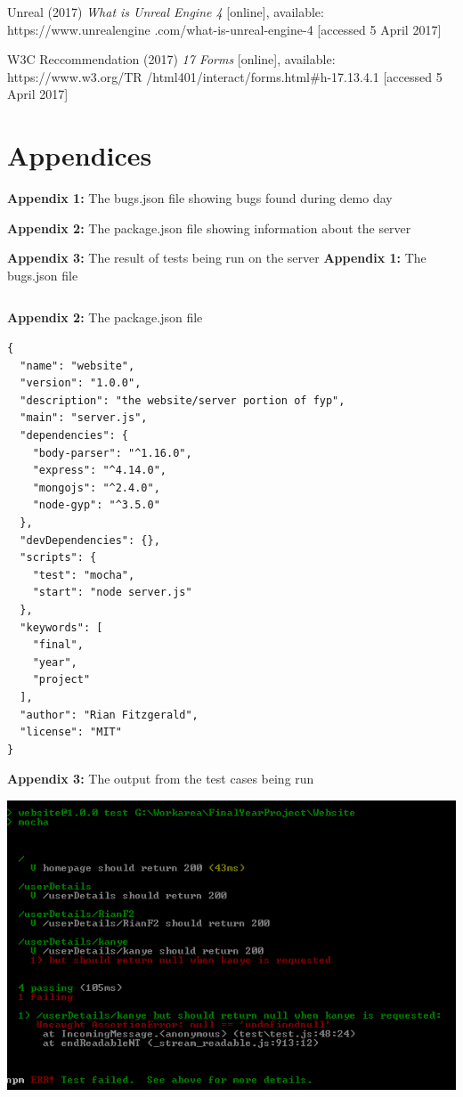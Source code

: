 \documentclass[12pt]{article}
\begin{document}
Unreal (2017) \textit{What is Unreal Engine 4} [online], available: https://www.unrealengine
\hangindent=0.5in .com/what-is-unreal-engine-4 [accessed 5 April 2017]

W3C Reccommendation (2017) \textit{17 Forms} [online], available: https://www.w3.org/TR
\hangindent=0.5in/html401/interact/forms.html{\#}h-17.13.4.1 [accessed 5 April 2017]

\newpage
\section*{Appendices}
\textbf{Appendix 1:} The bugs.json file showing bugs found during demo day

\textbf{Appendix 2:} The package.json file showing information about the server

\textbf{Appendix 3:} The result of tests being run on the server
\newpage
\textbf{Appendix 1:} The bugs.json file
\begin{lstlisting}

\end{lstlisting}
\textbf{Appendix 2:} The package.json file
\begin{lstlisting}
{
  "name": "website",
  "version": "1.0.0",
  "description": "the website/server portion of fyp",
  "main": "server.js",
  "dependencies": {
    "body-parser": "^1.16.0",
    "express": "^4.14.0",
    "mongojs": "^2.4.0",
    "node-gyp": "^3.5.0"
  },
  "devDependencies": {},
  "scripts": {
    "test": "mocha",
    "start": "node server.js"
  },
  "keywords": [
    "final",
    "year",
    "project"
  ],
  "author": "Rian Fitzgerald",
  "license": "MIT"
}
\end{lstlisting}

\newpage
\textbf{Appendix 3:} The output from the test cases being run

\includegraphics[scale=1]{test.png}
\end{document}
